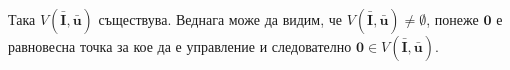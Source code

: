 

Така $V(\bar{\mathbf{I}}, \bar{\mathbf{u}})$ съществува. Веднага може да видим, че $V(\bar{\mathbf{I}}, \bar{\mathbf{u}}) \neq \emptyset$, понеже $\mathbf{0}$ е равновесна точка за кое да е управление и следователно $\mathbf{0} \in V(\bar{\mathbf{I}}, \bar{\mathbf{u}})$.
